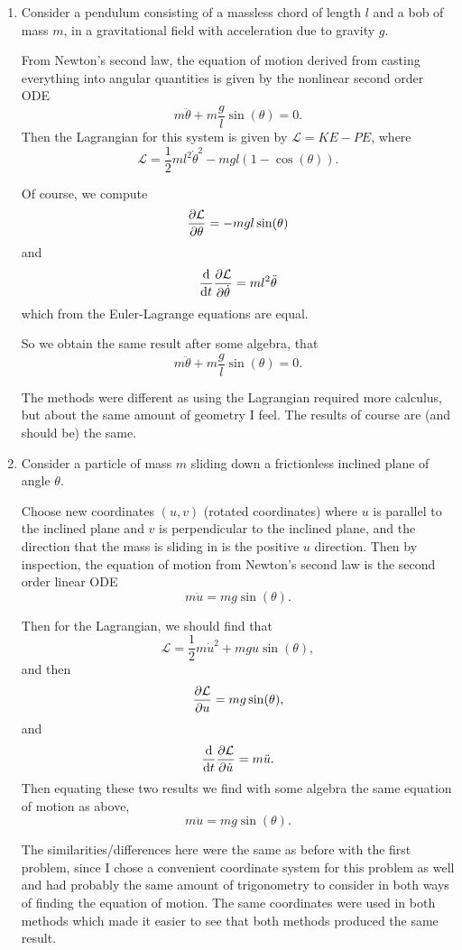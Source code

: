 \documentclass[11pt]{article}
\newcommand{\br}[1]{\left(#1\right)}
\begin{document}
\begin{enumerate}
    \item Consider a pendulum consisting of a massless chord of length $l$ and a bob of mass $m$, in a gravitational field with acceleration due to gravity $g$.\vspace*{5cm}
    
    From Newton's second law, the equation of motion derived from casting everything into angular quantities is given by the nonlinear second order ODE \[m\ddot{\theta} + m\frac{g}{l}\sin(\theta) = 0.\]
    Then the Lagrangian for this system is given by $\mathcal{L} = KE-PE$, where \[\mathcal{L} = \frac{1}{2}ml^2\dot{\theta}^2 - mgl\br{1-\cos(\theta)}.\]

    Of course, we compute \[\pdv{\mathcal{L}}{\theta} = -mgl\sin(\theta)\] and \[\dv{t} \pdv{\mathcal{L}}{\dot{\theta}} = ml^2\ddot{\theta}\] which from the Euler-Lagrange equations are equal. 
    
    So we obtain the same result after some algebra, that \[m\ddot{\theta} + m\frac{g}{l}\sin(\theta) = 0.\]
    
    The methods were different as using the Lagrangian required more calculus, but about the same amount of geometry I feel. The results of course are (and should be) the same.

    \item Consider a particle of mass $m$ sliding down a frictionless inclined plane of angle $\theta$.\vspace*{5cm}
    
    Choose new coordinates $(u,v)$ (rotated coordinates) where $u$ is parallel to the inclined plane and $v$ is perpendicular to the inclined plane, and the direction that the mass is sliding in is the positive $u$ direction. Then by inspection, the equation of motion from Newton's second law is the second order linear ODE \[m\ddot{u} = mg\sin(\theta).\]

    Then for the Lagrangian, we should find that \[\mathcal{L} = \frac{1}{2}m\dot{u}^2 + mgu\sin(\theta),\] and then \[\pdv{\mathcal{L}}{u} = mg\sin(\theta),\] and \[\dv{t} \pdv{\mathcal{L}}{\dot{u}} =m\ddot{u}.\]
    Then equating these two results we find with some algebra the same equation of motion as above, \[m\ddot{u} = mg\sin(\theta).\] 

    The similarities/differences here were the same as before with the first problem, since I chose a convenient coordinate system for this problem as well and had probably the same amount of trigonometry to consider in both ways of finding the equation of motion. The same coordinates were used in both methods which made it easier to see that both methods produced the same result.
\end{enumerate}
\end{document}

